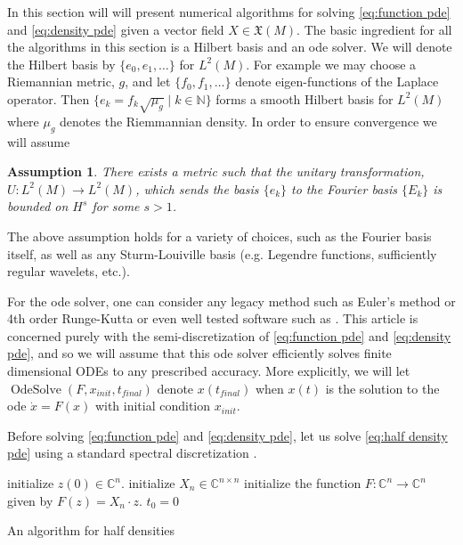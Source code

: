 \documentclass[12pt]{amsart}
\newtheorem{ass}{Assumption}
\DeclareMathOperator{\OdeSolve}{OdeSolve}
\begin{document}
In this section will will present numerical algorithms for solving \eqref{eq:function pde} and \eqref{eq:density pde} given a vector field $X \in \mathfrak{X}(M)$.
The basic ingredient for all the algorithms in this section is a Hilbert basis and an ode solver.
We will denote the Hilbert basis by $\{ e_{0}, e_{1},\dots \}$ for $L^{2}(M)$.
For example we may choose a Riemannian metric, $g$, and let $\{ f_{0}, f_{1},\dots \}$ denote  eigen-functions of the Laplace operator.
Then $\{ e_{k} = f_{k} \sqrt{\mu_{g}} \mid k \in \mathbb{N} \}$ forms a smooth Hilbert basis for $L^{2}(M)$ where $\mu_{g}$ denotes the Riemmannian density.
In order to ensure convergence we will assume
\begin{ass} \label{ass:basis}
	There exists a metric such that the unitary transformation, $U:L^{2}(M) \to L^{2}(M)$, which sends the basis $\{ e_{k} \}$ to the Fourier basis $\{E_{k} \}$
	is bounded on $H^{s}$ for some $s > 1$.
\end{ass}
The above assumption holds for a variety of choices, such as the Fourier basis itself, as well as any Sturm-Louiville basis (e.g. Legendre functions, sufficiently regular wavelets, etc.).

For the ode solver, one can consider any legacy method such as Euler's method or 4th order Runge-Kutta or even well tested software such as \cite{VODE}.
This article is concerned purely with the semi-discretization of \eqref{eq:function pde} and \eqref{eq:density pde}, and so we will assume that this ode solver 
efficiently solves finite dimensional ODEs to any prescribed accuracy.
More explicitly, we will let $\OdeSolve ( F , x_{init} , t_{final} )$ denote $x(t_{final})$ when $x(t)$ is the solution to the ode $\dot{x} = F(x)$ with initial condition $x_{init}$.

Before solving \eqref{eq:function pde} and \eqref{eq:density pde}, let us solve \eqref{eq:half density pde} using a standard spectral discretization \cite{Boyd2001,NumericalRecipes}.

\begin{algorithm}
	initialize $z(0) \in \mathbb{C}^{n}$.\;
	initialize $X_{n} \in \mathbb{C}^{n \times n}$\;
	initialize the function $F: \mathbb{C}^{n} \to \mathbb{C}^{n}$ given by $F(z) = X_{n} \cdot z$.\;
	$t_{0} = 0$\;
	\caption{An algorithm for half densities} \label{alg:half density}
\end{algorithm}
\end{document}
